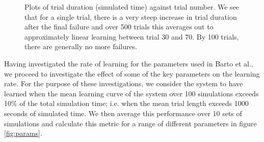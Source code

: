 \documentclass{article}
\begin{document}
\begin{figure}[h]
\begin{subfigure}[t]{0.28\linewidth}
		\label{fig:500trials}	
	\end{subfigure}
\caption{Plots of trial duration (simulated time) against trial number. We see that for a single trial, there is a very steep increase in trial duration after the final failure and over 500 trials this averages out to approximately linear learning between trial 30 and 70. By 100 trials, there are generally no more failures.}
\label{fig:cartpole_learning}
\end{figure}

Having investigated the rate of learning for the parameters used in Barto et al., we proceed to investigate the effect of some of the key parameters on the learning rate. For the purpose of these investigations, we consider the system to have learned when the mean learning curve of the system over 100 simulations exceeds 10\% of the total simulation time; i.e. when the mean trial length exceeds 1000 seconds of simulated time. We then average this performance over 10 sets of simulations and calculate this metric for a range of different parameters in figure \ref{fig:params}.
\end{document}
